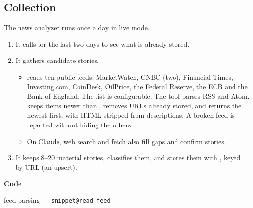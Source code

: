 \documentclass[11pt,a4paper]{article}
\makeatletter
\newcommand{\snippetsource}[1]{\csname snippet@#1\endcsname}
\newcommand{\snippet}[3]{%
  }
\newenvironment{codepointers}{%
  \par\smallskip\begingroup\footnotesize\noindent\textcolor{blue!50!black}{\textbf{Code}}\par\nopagebreak
  \begin{list}{}{\setlength{\leftmargin}{1.2em}\setlength{\itemsep}{0pt}\setlength{\parsep}{0pt}\setlength{\topsep}{1pt}}}%
  {\end{list}\endgroup\smallskip}
\newcommand{\codeitem}[2]{\item #2 --- \texttt{\snippetsource{#1}}}
\makeatother
\begin{document}
\subsection{Collection}\label{sec:news-collection}
The news analyzer runs once a day in live mode.
\begin{enumerate}
  \item It calls  for the last two days to see what is already stored.
  \item It gathers candidate stories.
        \begin{itemize}
          \item {} reads ten public feeds: MarketWatch, CNBC (two),
                Financial Times, Investing.com, CoinDesk, OilPrice, the Federal Reserve, the
                ECB and the Bank of England. The list is configurable. The tool parses RSS
                and Atom, keeps items newer than , removes URLs already
                stored, and returns the newest first, with HTML stripped from descriptions.
                A broken feed is reported without hiding the others.
          \item On Claude, web search and fetch also fill gaps and confirm stories.
        \end{itemize}
  \item It keeps 8--20 material stories, classifies them, and stores them with
        , keyed by URL (an upsert).
\end{enumerate}
\snippet{fetch_news_feeds}{Python}{RSS and Atom headlines without stored articles}
\begin{codepointers}
  \codeitem{read_feed}{feed parsing}
\end{codepointers}
\end{document}
